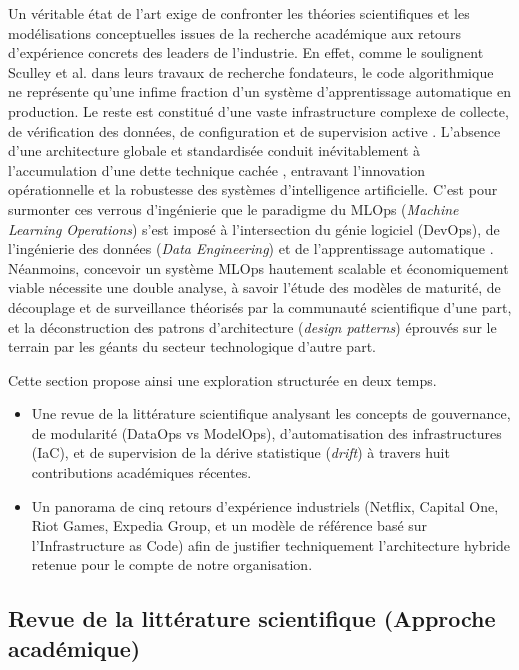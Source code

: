 Un véritable état de l'art exige de confronter les théories scientifiques et les modélisations conceptuelles issues de la recherche académique aux retours d'expérience concrets des leaders de l'industrie. En effet, comme le soulignent Sculley et al. dans leurs travaux de recherche fondateurs, le code algorithmique ne représente qu'une infime fraction d'un système d'apprentissage automatique en production. Le reste est constitué d'une vaste infrastructure complexe de collecte, de vérification des données, de configuration et de supervision active \cite{82}. L'absence d'une architecture globale et standardisée conduit inévitablement à l'accumulation d'une dette technique cachée \cite{82}, entravant l'innovation opérationnelle et la robustesse des systèmes d'intelligence artificielle. C'est pour surmonter ces verrous d'ingénierie que le paradigme du MLOps (\textit{Machine Learning Operations}) s'est imposé à l'intersection du génie logiciel (DevOps), de l'ingénierie des données (\textit{Data Engineering}) et de l'apprentissage automatique \cite{85}. Néanmoins, concevoir un système MLOps hautement scalable et économiquement viable nécessite une double analyse, à savoir l'étude des modèles de maturité, de découplage et de surveillance théorisés par la communauté scientifique d'une part, et la déconstruction des patrons d'architecture (\textit{design patterns}) éprouvés sur le terrain par les géants du secteur technologique d'autre part.

Cette section propose ainsi une exploration structurée en deux temps.
\begin{itemize}
    \item[$\bullet$] Une revue de la littérature scientifique analysant les concepts de gouvernance, de modularité (DataOps vs ModelOps), d'automatisation des infrastructures (IaC), et de supervision de la dérive statistique (\textit{drift}) à travers huit contributions académiques récentes.
    \item[$\bullet$] Un panorama de cinq retours d'expérience industriels (Netflix, Capital One, Riot Games, Expedia Group, et un modèle de référence basé sur l'Infrastructure as Code) afin de justifier techniquement l'architecture hybride retenue pour le compte de notre organisation.
\end{itemize}

\vspace{0.5cm}


\subsection{Revue de la littérature scientifique (Approche académique)}
\label{subsec:revue_litterature_acad}

